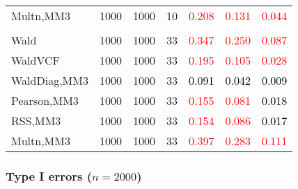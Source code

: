 \documentclass[
]{article}
\begin{document}
\begin{table}[H]
{\begin{tabular}[t]{lrrrrrr}
\hspace{1em}Multn,MM3 & 1000 & 1000 & 10 & \textcolor{red}{0.208} & \textcolor{red}{0.131} & \textcolor{red}{0.044}\\
\addlinespace[0.3em]
\multicolumn{7}{l}{\textbf{3F 15V}}\\
\hspace{1em}Wald & 1000 & 1000 & 33 & \textcolor{red}{0.347} & \textcolor{red}{0.250} & \textcolor{red}{0.087}\\
\hspace{1em}WaldVCF & 1000 & 1000 & 33 & \textcolor{red}{0.195} & \textcolor{red}{0.105} & \textcolor{red}{0.028}\\
\hspace{1em}WaldDiag,MM3 & 1000 & 1000 & 33 & \textcolor{black}{0.091} & \textcolor{black}{0.042} & \textcolor{black}{0.009}\\
\hspace{1em}Pearson,MM3 & 1000 & 1000 & 33 & \textcolor{red}{0.155} & \textcolor{red}{0.081} & \textcolor{black}{0.018}\\
\hspace{1em}RSS,MM3 & 1000 & 1000 & 33 & \textcolor{red}{0.154} & \textcolor{red}{0.086} & \textcolor{black}{0.017}\\
\hspace{1em}Multn,MM3 & 1000 & 1000 & 33 & \textcolor{red}{0.397} & \textcolor{red}{0.283} & \textcolor{red}{0.111}\\
\bottomrule
\end{tabular}}
\endgroup{}
\end{table}

\hypertarget{type-i-errors-n2000-3}{%
\subsubsection{\texorpdfstring{Type I errors
(\(n=2000\))}{Type I errors (n=2000)}}\label{type-i-errors-n2000-3}}
\end{document}
